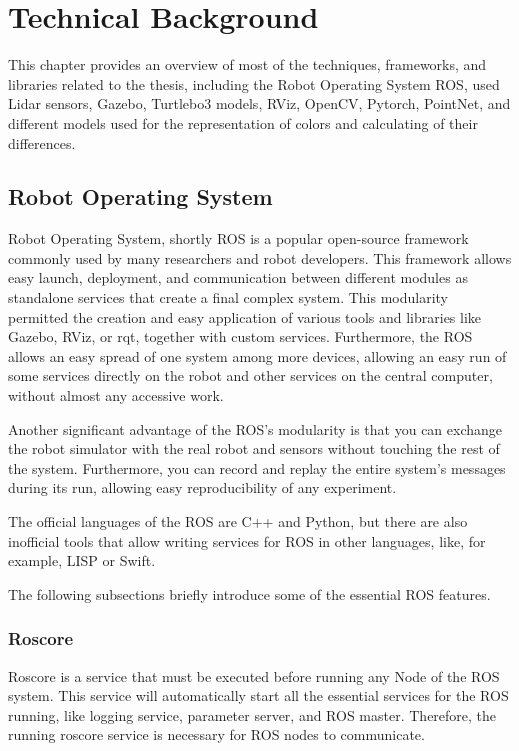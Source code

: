 \chapter{Technical Background}\label{chapter:technicalBackground}

This chapter provides an overview of most of the techniques, frameworks, and libraries related to the thesis, including the Robot Operating System ROS, used Lidar sensors, Gazebo, Turtlebo3 models, RViz, OpenCV, Pytorch, PointNet, and different models used for the representation of colors and calculating of their differences.

\section{Robot Operating System}\label{section:ROS}

Robot Operating System\cite{ros}, shortly ROS is a popular open-source framework commonly used by many researchers and robot developers. This framework allows easy launch, deployment, and communication between different modules as standalone services that create a final complex system. This modularity permitted the creation and easy application of various tools and libraries like Gazebo, RViz, or rqt, together with custom services. Furthermore, the ROS allows an easy spread of one system among more devices, allowing an easy run of some services directly on the robot and other services on the central computer, without almost any accessive work.\par
Another significant advantage of the ROS's modularity is that you can exchange the robot simulator with the real robot and sensors without touching the rest of the system. Furthermore, you can record and replay the entire system's messages during its run, allowing easy reproducibility of any experiment.\par
The official languages of the ROS are C++ and Python, but there are also inofficial tools that allow writing services for ROS in other languages, like, for example, LISP \cite{RosLISP} or Swift\cite{RosSwift}.\par
The following subsections briefly introduce some of the essential ROS features.

\subsection*{Roscore}

Roscore is a service that must be executed before running any Node of the ROS system. This service will automatically start all the essential services for the ROS running, like logging service, parameter server, and ROS master. Therefore, the running roscore service is necessary for ROS nodes to communicate.

